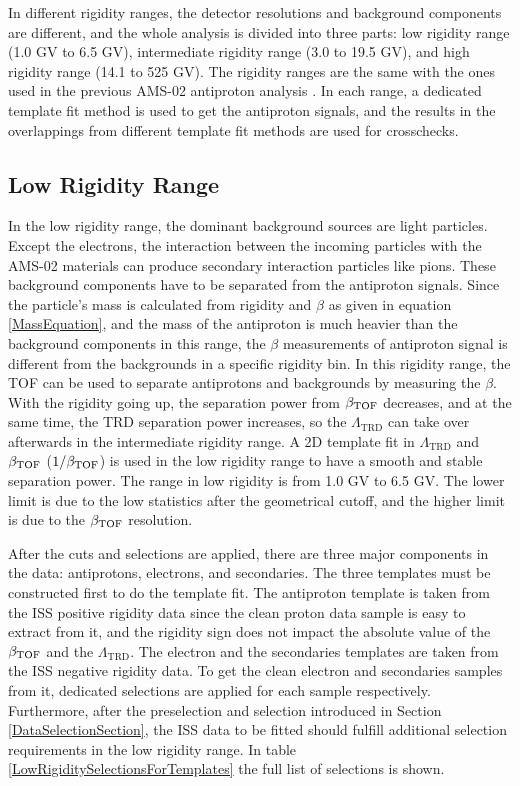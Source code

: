 In different rigidity ranges, the detector resolutions and background components are different, and the whole analysis is divided into three parts: low rigidity range (1.0 GV to 6.5 GV), intermediate rigidity range (3.0 to 19.5 GV), and high rigidity range (14.1 to 525 GV). The rigidity ranges are the same with the ones used in the previous AMS-02 antiproton analysis \cite{AMS02AntiprotonPRL2016}. In each range, a dedicated template fit method is used to get the antiproton signals, and the results in the overlappings from different template fit methods are used for crosschecks. \par

\subsection*{Low Rigidity Range}
In the low rigidity range, the dominant background sources are light particles. Except the electrons, the interaction between the incoming particles with the AMS-02 materials can produce secondary interaction particles like pions. These background components have to be separated from the antiproton signals. Since the particle's mass is calculated from rigidity and $\beta$ as given in equation \ref{MassEquation}, and the mass of the antiproton is much heavier than the background components in this range, the $\beta$ measurements of antiproton signal is different from the backgrounds in a specific rigidity bin. In this rigidity range, the TOF can be used to separate antiprotons and backgrounds by measuring the $\beta$. With the rigidity going up, the separation power from $\beta_{\rm{TOF}}$ decreases, and at the same time, the TRD separation power increases, so the $\Lambda_\mathrm{TRD}$ can take over afterwards in the intermediate rigidity range. A 2D template fit in $\Lambda_\mathrm{TRD}$ and $\beta_{\rm{TOF}}$ ($1/{\beta_{\rm{TOF}}}$) is used in the low rigidity range to have a smooth and stable separation power. The range in low rigidity is from 1.0 GV to 6.5 GV. The lower limit is due to the low statistics after the geometrical cutoff, and the higher limit is due to the $\beta_{\rm{TOF}}$ resolution. \par
After the cuts and selections are applied, there are three major components in the data: antiprotons, electrons, and secondaries. The three templates must be constructed first to do the template fit. The antiproton template is taken from the ISS positive rigidity data since the clean proton data sample is easy to extract from it, and the rigidity sign does not impact the absolute value of the $\beta_{\rm{TOF}}$ and the $\Lambda_\mathrm{TRD}$. The electron and the secondaries templates are taken from the ISS negative rigidity data. To get the clean electron and secondaries samples from it, dedicated selections are applied for each sample respectively. Furthermore, after the preselection and selection introduced in Section \ref{DataSelectionSection}, the ISS data to be fitted should fulfill additional selection requirements in the low rigidity range. In table \ref{LowRigiditySelectionsForTemplates} the full list of selections is shown.  \par 

